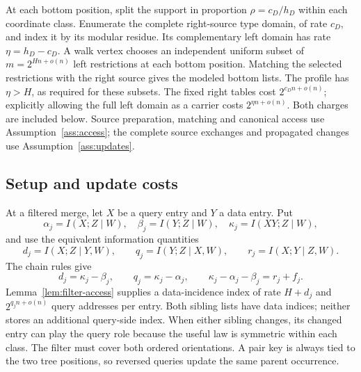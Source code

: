 \documentclass[10pt,a4paper]{article}
\theoremstyle{definition}
\begin{document}
At each bottom position, split the support in proportion
$\rho=c_D/h_D$ within each coordinate class. Enumerate the complete
right-source type domain, of rate $c_D$, and index it by its modular
residue. Its complementary left domain has rate
$\eta=h_D-c_D$. A walk vertex chooses an independent uniform subset
of $m=2^{Hn+o(n)}$ left restrictions at each bottom position. Matching
the selected restrictions with the right source gives the modeled
bottom lists. The profile has $\eta>H$, as required for these subsets.
The fixed right tables cost $2^{c_Dn+o(n)}$; explicitly allowing the
full left domain as a carrier costs $2^{\eta n+o(n)}$. Both charges are
included below. Source preparation, matching and canonical access use
Assumption~\ref{ass:access}; the complete source exchanges and propagated
changes use Assumption~\ref{ass:updates}.

\subsection{Setup and update costs}

At a filtered merge, let $X$ be a query entry and $Y$ a data entry. Put
\[
 \alpha_j=I(X;Z\mid W),\quad \beta_j=I(Y;Z\mid W),\quad
 \kappa_j=I(XY;Z\mid W),
\]
and use the equivalent information quantities
\[
 d_j=I(X;Z\mid Y,W),\qquad q_j=I(Y;Z\mid X,W),\qquad
 r_j=I(X;Y\mid Z,W).
\]
The chain rules give
\begin{equation}
 d_j=\kappa_j-\beta_j,\qquad
 q_j=\kappa_j-\alpha_j,\qquad
 \kappa_j-\alpha_j-\beta_j=r_j+f_j.
 \label{qraqm:information}
\end{equation}
Lemma~\ref{lem:filter-access} supplies a data-incidence index of rate
$H+d_j$ and $2^{q_jn+o(n)}$ query addresses per entry. Both sibling
lists have data indices; neither stores an additional query-side index.
When either sibling changes, its changed entry can play the query role
because the useful law is symmetric within each class. The filter must
cover both ordered orientations. A pair key is always tied to the two
tree positions, so reversed queries update the same parent occurrence.
\end{document}
